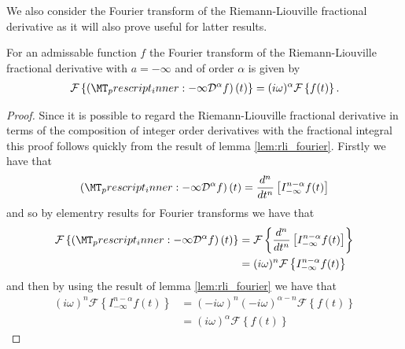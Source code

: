 We also consider the Fourier transform of the Riemann-Liouville fractional derivative as it will also prove useful for latter results.
\begin{mdframed}[innertopmargin=10pt]
\begin{lemma}
    \label{lem:rld_fourier}
    For an admissable function $ f $ the Fourier transform of the Riemann-Liouville fractional derivative with $ a = -\infty $ and of order $ \alpha $ is given by
    \begin{align}
        \mathcal{F}\left\{ \left(\prescript{}{-\infty}{\mathcal{D}}^\alpha f\right)(t) \right\} = (i\omega)^{\alpha} \mathcal{F}\left\{ f(t) \right\}.
    \end{align}
\end{lemma}
\end{mdframed}
\begin{proof}
    Since it is possible to regard the Riemann-Liouville fractional derivative in terms of the composition of integer order derivatives with the fractional integral this proof follows quickly from the result of lemma \ref{lem:rli_fourier}.
    Firstly we have that
    \begin{align}
        \left(\prescript{}{-\infty}{\mathcal{D}}^\alpha f\right)(t) = \frac{d^n}{dt^n} \left[ I_{-\infty}^{n - \alpha} f(t)\right]
    \end{align}
    and so by elementry results for Fourier transforms we have that
    \begin{align}
        \mathcal{F}\left\{ \left(\prescript{}{-\infty}{\mathcal{D}}^\alpha f\right)(t) \right\}  &=
        \mathcal{F}\left\{ \frac{d^n}{dt^n} \left[ I_{-\infty}^{n-\alpha} f(t) \right] \right\} \\
        &= (i\omega)^{n} \mathcal{F}\left\{ I_{-\infty}^{n-\alpha} f(t) \right\}
    \end{align}
    and then by using the result of lemma \ref{lem:rli_fourier} we have that
    \begin{align}
        (i\omega)^{n} \mathcal{F}\left\{ I_{-\infty}^{n-\alpha} f(t) \right\} &= (-i\omega)^{n}(-i\omega)^{\alpha - n}\mathcal{F}\left\{ f(t)\right\} \\
        &= (i\omega)^\alpha  \mathcal{F}\left\{ f(t) \right\}
    \end{align}
\end{proof}

